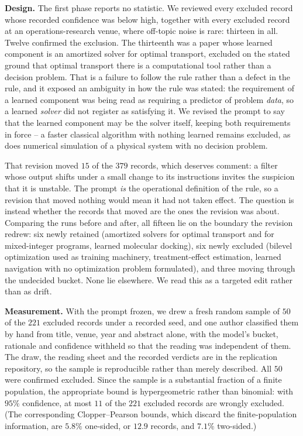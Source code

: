 \textbf{Design.} The first phase reports no statistic. We reviewed every excluded record whose
recorded confidence was below high, together with every excluded record at an operations-research
venue, where off-topic noise is rare: thirteen in all. Twelve confirmed the exclusion. The thirteenth
was a paper whose learned component is an amortized solver for optimal transport, excluded on the
stated ground that optimal transport there is a computational tool rather than a decision problem.
That is a failure to follow the rule rather than a defect in the rule, and it exposed an ambiguity in
how the rule was stated: the requirement of a learned component was being read as requiring a
predictor of problem \emph{data}, so a learned \emph{solver} did not register as satisfying it. We
revised the prompt to say that the learned component may be the solver itself, keeping both
requirements in force -- a faster classical algorithm with nothing learned remains excluded, as does
numerical simulation of a physical system with no decision problem.

That revision moved \(15\) of the \(379\) records, which deserves comment: a filter whose output
shifts under a small change to its instructions invites the suspicion that it is unstable. The prompt
\emph{is} the operational definition of the rule, so a revision that moved nothing would mean it had
not taken effect. The question is instead whether the records that moved are the ones the revision
was about. Comparing the runs before and after, all fifteen lie on the boundary the revision redrew:
six newly retained (amortized solvers for optimal transport and for mixed-integer programs, learned
molecular docking), six newly excluded (bilevel optimization used as training machinery,
treatment-effect estimation, learned navigation with no optimization problem formulated), and three
moving through the undecided bucket. None lie elsewhere. We read this as a targeted edit rather than
as drift.

\textbf{Measurement.} With the prompt frozen, we drew a fresh random sample of \(50\) of the \(221\)
excluded records under a recorded seed, and one author classified them by hand from title, venue,
year and abstract alone, with the model's bucket, rationale and confidence withheld so that the
reading was independent of them. The draw, the reading sheet and the recorded verdicts are in the
replication repository, so the sample is reproducible rather than merely described. All \(50\) were
confirmed excluded. Since the sample is a substantial fraction of a finite population, the
appropriate bound is hypergeometric rather than binomial: with \(95\%\) confidence, at most \(11\) of
the \(221\) excluded records are wrongly excluded. (The corresponding Clopper--Pearson bounds, which
discard the finite-population information, are \(5.8\%\) one-sided, or \(12.9\) records, and
\(7.1\%\) two-sided.)

